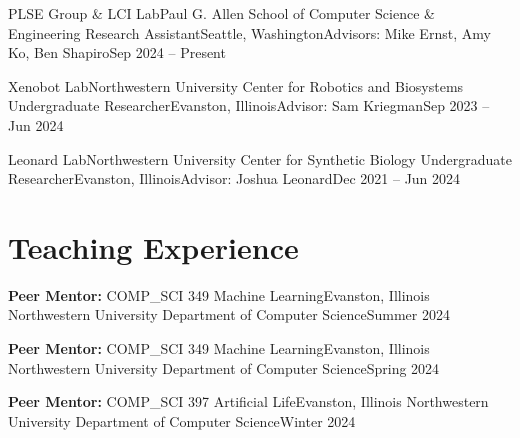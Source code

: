 \documentclass{resume}
\begin{document}
    \resumeResearchSubheading
      {PLSE Group \& LCI Lab}{Paul G. Allen School of Computer Science \& Engineering}
      {Research Assistant}{Seattle, Washington}{Advisors: Mike Ernst, Amy Ko, Ben Shapiro}{Sep 2024 – Present}
        \resumeItemListStart
        \resumeItemListEnd
      
      \resumeResearchSubheading
      {Xenobot Lab}{Northwestern University Center for Robotics and Biosystems}
      {Undergraduate Researcher}{Evanston, Illinois}{Advisor: Sam Kriegman}{Sep 2023 – Jun 2024}
        \resumeItemListStart
        \resumeItemListEnd

      \resumeResearchSubheading
      {Leonard Lab}{Northwestern University Center for Synthetic Biology}
      {Undergraduate Researcher}{Evanston, Illinois}{Advisor: Joshua Leonard}{Dec 2021 – Jun 2024}
        \resumeItemListStart
        \resumeItemListEnd
    
  \resumeSubHeadingListEnd


  \section{Teaching Experience}
  \vspace{3pt}
  \resumeSubHeadingListStart

    \resumeSubheading
      {\textbf{Peer Mentor:} COMP\_SCI 349 Machine Learning}{Evanston, Illinois}
      {Northwestern University Department of Computer Science}{Summer 2024}
    
    \resumeSubheading
      {\textbf{Peer Mentor:} COMP\_SCI 349 Machine Learning}{Evanston, Illinois}
      {Northwestern University Department of Computer Science}{Spring 2024}
    
    \resumeSubheading
      {\textbf{Peer Mentor:} COMP\_SCI 397 Artificial Life}{Evanston, Illinois}
      {Northwestern University Department of Computer Science}{Winter 2024}
    
\end{document}

